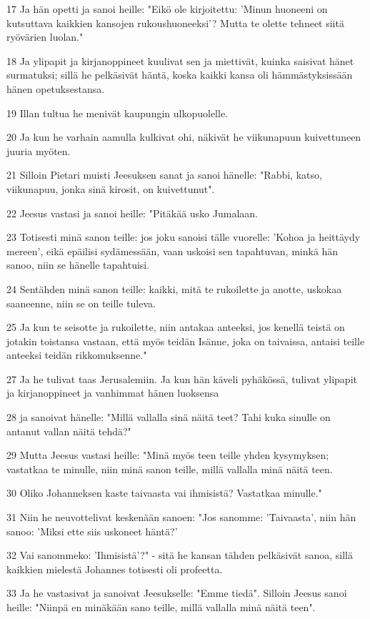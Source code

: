 \par 17 Ja hän opetti ja sanoi heille: "Eikö ole kirjoitettu: 'Minun huoneeni on kutsuttava kaikkien kansojen rukoushuoneeksi'? Mutta te olette tehneet siitä ryövärien luolan."
\par 18 Ja ylipapit ja kirjanoppineet kuulivat sen ja miettivät, kuinka saisivat hänet surmatuksi; sillä he pelkäsivät häntä, koska kaikki kansa oli hämmästyksissään hänen opetuksestansa.
\par 19 Illan tultua he menivät kaupungin ulkopuolelle.
\par 20 Ja kun he varhain aamulla kulkivat ohi, näkivät he viikunapuun kuivettuneen juuria myöten.
\par 21 Silloin Pietari muisti Jeesuksen sanat ja sanoi hänelle: "Rabbi, katso, viikunapuu, jonka sinä kirosit, on kuivettunut".
\par 22 Jeesus vastasi ja sanoi heille: "Pitäkää usko Jumalaan.
\par 23 Totisesti minä sanon teille: jos joku sanoisi tälle vuorelle: 'Kohoa ja heittäydy mereen', eikä epäilisi sydämessään, vaan uskoisi sen tapahtuvan, minkä hän sanoo, niin se hänelle tapahtuisi.
\par 24 Sentähden minä sanon teille: kaikki, mitä te rukoilette ja anotte, uskokaa saaneenne, niin se on teille tuleva.
\par 25 Ja kun te seisotte ja rukoilette, niin antakaa anteeksi, jos kenellä teistä on jotakin toistansa vastaan, että myös teidän Isänne, joka on taivaissa, antaisi teille anteeksi teidän rikkomuksenne."
\par 27 Ja he tulivat taas Jerusalemiin. Ja kun hän käveli pyhäkössä, tulivat ylipapit ja kirjanoppineet ja vanhimmat hänen luoksensa
\par 28 ja sanoivat hänelle: "Millä vallalla sinä näitä teet? Tahi kuka sinulle on antanut vallan näitä tehdä?"
\par 29 Mutta Jeesus vastasi heille: "Minä myös teen teille yhden kysymyksen; vastatkaa te minulle, niin minä sanon teille, millä vallalla minä näitä teen.
\par 30 Oliko Johanneksen kaste taivaasta vai ihmisistä? Vastatkaa minulle."
\par 31 Niin he neuvottelivat keskenään sanoen: "Jos sanomme: 'Taivaasta', niin hän sanoo: 'Miksi ette siis uskoneet häntä?'
\par 32 Vai sanommeko: 'Ihmisistä'?" - sitä he kansan tähden pelkäsivät sanoa, sillä kaikkien mielestä Johannes totisesti oli profeetta.
\par 33 Ja he vastasivat ja sanoivat Jeesukselle: "Emme tiedä". Silloin Jeesus sanoi heille: "Niinpä en minäkään sano teille, millä vallalla minä näitä teen".

